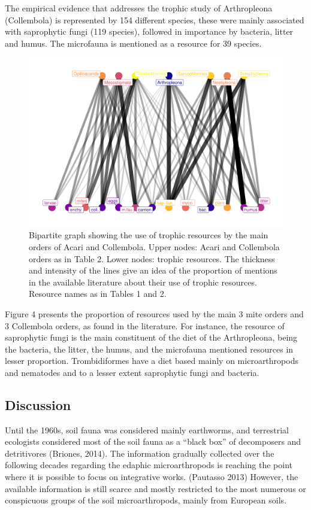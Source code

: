 \documentclass[10pt,oneside]{article}
\makeatletter
\def\maxwidth{\ifdim\Gin@nat@width>\linewidth\linewidth
\else\Gin@nat@width\fi}
\let\Oldincludegraphics\includegraphics
\renewcommand{\includegraphics}[1]{\Oldincludegraphics[width=\maxwidth]{#1}}
\makeatother
\begin{document}
The empirical evidence that addresses the trophic study of Arthropleona
(Collembola) is represented by 154 different species, these were mainly
associated with saprophytic fungi (119 species), followed in importance
by bacteria, litter and humus. The microfauna is mentioned as a resource
for 39 species.

\begin{figure}
\centering
\includegraphics{figures/Bi_Orden_Recurso.png}
\caption{Bipartite graph showing the use of trophic resources by the
main orders of Acari and Collembola. Upper nodes: Acari and Collembola
orders as in Table 2. Lower nodes: trophic resources. The thickness and
intensity of the lines give an idea of the proportion of mentions in the
available literature about their use of trophic resources. Resource
names as in Tables 1 and 2.}
\end{figure}

Figure 4 presents the proportion of resources used by the main 3 mite
orders and 3 Collembola orders, as found in the literature. For
instance, the resource of saprophytic fungi is the main constituent of
the diet of the Arthropleona, being the bacteria, the litter, the humus,
and the microfauna mentioned resources in lesser proportion.
Trombidiformes have a diet based mainly on microarthropods and nematodes
and to a lesser extent saprophytic fungi and bacteria.

\hypertarget{discussion}{%
\subsection{Discussion}\label{discussion}}

Until the 1960s, soil fauna was considered mainly earthworms, and
terrestrial ecologists considered most of the soil fauna as a ``black
box'' of decomposers and detritivores (Briones, 2014). The information
gradually collected over the following decades regarding the edaphic
microarthropods is reaching the point where it is possible to focus on
integrative works. (Pautasso 2013) However, the available information is
still scarce and mostly restricted to the most numerous or conspicuous
groups of the soil microarthropods, mainly from European soils.
\end{document}
